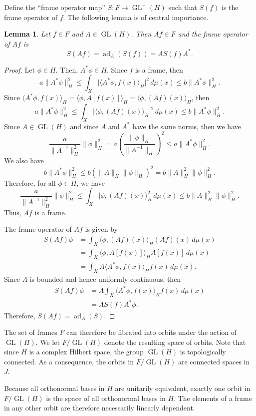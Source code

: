 \documentclass{article}
\newtheorem{lemma}[defn]{Lemma}
\newcommand{\ad}{\operatorname{ad}}
\newcommand{\GL}{\operatorname{GL}}
\begin{document}
Define the ``frame operator map'' $S:F\mapsto \GL^+(H)$ such that $S(f)$ is the frame operator of $f$. The following lemma is of central importance.
\begin{lemma} \label{LinearDeform}
Let $f\in F$ and $A\in\GL(H)$. Then $Af\in F$ and the frame operator of $Af$ is 
$$S(Af) = \ad_A(S(f)) = AS(f)A^*.$$
\end{lemma}
\begin{proof}
Let $\phi\in H$. Then, $A^*\phi\in H$. Since $f$ is a frame, then
\[ a\|A^*\phi\|_H^2 \leq \int_X\lvert\langle A^*\phi, f(x)\rangle_H\rvert^2\,d\mu(x) \leq b\|A^*\phi\|_H^2. \]
Since $\langle A^*\phi,f(x)\rangle_H = \langle\phi, A[f(x)]\rangle_H = \langle\phi, (Af)(x)\rangle_H$, then
\[ a\|A^*\phi\|_H^2 \leq \int_X\lvert\langle \phi, (Af)(x)\rangle_H\rvert^2\,d\mu(x) \leq b\|A^*\phi\|_H^2. \]
Since $A\in\GL(H)$ and since $A$ and $A^*$ have the same norms, then we have
\[ \frac{a}{\|A^{-1}\|_H^2}\|\phi\|_H^2 = a\left(\frac{\|\phi\|_H}{\|A^{-1}\|_H}\right)^2
\leq a\|A^*\phi\|_H^2. \]
We also have
\[ b\|A^*\phi\|_H^2 \leq b(\|A\|_H\|\phi\|_H)^2 = b\|A\|_H^2\|\phi\|_H^2. \]
Therefore, for all $\phi\in H$, we have
\[ \frac{a}{\|A^{-1}\|_H^2}\|\phi\|_H^2 \leq \int_X\lvert\phi,(Af)(x)\rangle_H^2\,d\mu(x) \leq b\|A\|_H^2\|\phi\|_H^2. \]
Thus, $Af$ is a frame.

The frame operator of $Af$ is given by
\begin{align*}
S(Af)\phi &= \int_X\langle\phi, (Af)(x)\rangle_H(Af)(x)\,d\mu(x) \\
&= \int_X\langle\phi,A[f(x)]\rangle_HA[f(x)]\,d\mu(x) \\
&= \int_X A\langle A^*\phi, f(x)\rangle_H f(x)\,d\mu(x).
\end{align*}
Since $A$ is bounded and hence uniformly continuous, then
\begin{align*}
S(Af)\phi &= A\int_X\langle A^*\phi, f(x)\rangle_H f(x)\,d\mu(x) \\
&= AS(f)A^*\phi.
\end{align*}
Therefore, $S(Af) = \ad_A(S)$.
\end{proof}

The set of frames $F$ can therefore be fibrated into orbits under the action of $\GL(H)$. We let $F/\GL(H)$ denote the resulting space of orbits. Note that since $H$ is a complex Hilbert space, the group $\GL(H)$ is topologically connected. As a consequence, the orbits in $F/\GL(H)$ are connected spaces in $J$.

Because all orthonormal bases in $H$ are unitarily equivalent, exactly one orbit in $F/\GL(H)$ is the space of all orthonormal bases in $H$. The elements of a frame in any other orbit are therefore necessarily linearly dependent.
\end{document}
